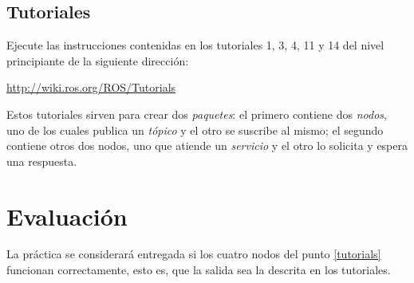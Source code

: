 \documentclass[a4paper,12pt]{article}
\begin{document}
\subsection{Tutoriales\label{tutorials}}

Ejecute las instrucciones contenidas en los tutoriales 1, 3, 4, 11 y 14 del nivel principiante de la siguiente dirección:

\url{http://wiki.ros.org/ROS/Tutorials}

Estos tutoriales sirven para crear dos \textit{paquetes}: el primero contiene dos \textit{nodos}, uno de los cuales publica un \textit{tópico} y el otro se suscribe al mismo; el segundo contiene otros dos nodos, uno que atiende un \textit{servicio} y el otro lo solicita y espera una respuesta. 

\section{Evaluación}

La práctica se considerará entregada si los cuatro nodos del punto \ref{tutorials} funcionan correctamente, esto es, que la salida sea la descrita en los tutoriales. 
\end{document}
